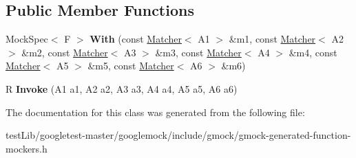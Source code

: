 \subsection*{Public Member Functions}
\begin{DoxyCompactItemize}
\item 
\mbox{\label{classtesting_1_1internal_1_1FunctionMocker_3_01R_07A1_00_01A2_00_01A3_00_01A4_00_01A5_00_01A6_08_4_a5aaa2bc19a6180f55eee2cc1e0dfa939}} 
Mock\+Spec$<$ F $>$ {\bfseries With} (const \hyperlink{classtesting_1_1Matcher}{Matcher}$<$ A1 $>$ \&m1, const \hyperlink{classtesting_1_1Matcher}{Matcher}$<$ A2 $>$ \&m2, const \hyperlink{classtesting_1_1Matcher}{Matcher}$<$ A3 $>$ \&m3, const \hyperlink{classtesting_1_1Matcher}{Matcher}$<$ A4 $>$ \&m4, const \hyperlink{classtesting_1_1Matcher}{Matcher}$<$ A5 $>$ \&m5, const \hyperlink{classtesting_1_1Matcher}{Matcher}$<$ A6 $>$ \&m6)
\item 
\mbox{\label{classtesting_1_1internal_1_1FunctionMocker_3_01R_07A1_00_01A2_00_01A3_00_01A4_00_01A5_00_01A6_08_4_a8499277f15101fefacbb0c9d93b8153b}} 
R {\bfseries Invoke} (A1 a1, A2 a2, A3 a3, A4 a4, A5 a5, A6 a6)
\end{DoxyCompactItemize}


The documentation for this class was generated from the following file\+:\begin{DoxyCompactItemize}
\item 
test\+Lib/googletest-\/master/googlemock/include/gmock/gmock-\/generated-\/function-\/mockers.\+h\end{DoxyCompactItemize}
